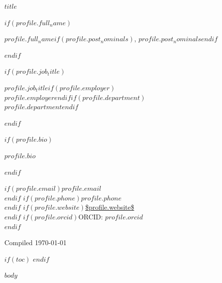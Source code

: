 \documentclass[11pt,a4paper]{article}
\begin{document}
\begin{titlepage}
\centering
\vspace*{4cm}

{\Huge\bfseries\sffamily $title$\par}

\vspace{2cm}

$if(profile.full_name)$
{\LARGE\sffamily $profile.full_name$$if(profile.post_nominals)$, $profile.post_nominals$$endif$\par}
\vspace{0.4cm}
$endif$

$if(profile.job_title)$
{\large $profile.job_title$$if(profile.employer)$\\$profile.employer$$endif$$if(profile.department)$\\$profile.department$$endif$\par}
$endif$

\vspace{2.5cm}

$if(profile.bio)$
\begin{minipage}{0.78\textwidth}
\noindent\itshape $profile.bio$
\end{minipage}
\vspace{1.5cm}
$endif$

\vfill

$if(profile.email)$\textsf{\small $profile.email$}\\$endif$
$if(profile.phone)$\textsf{\small $profile.phone$}\\$endif$
$if(profile.website)$\textsf{\small \url{$profile.website$}}\\$endif$
$if(profile.orcid)$\textsf{\small ORCID: $profile.orcid$}\\$endif$

\vspace{1cm}

{\small Compiled \today}

\end{titlepage}

$if(toc)$
\thispagestyle{empty}
\tableofcontents
\newpage
$endif$

$body$
\end{document}
